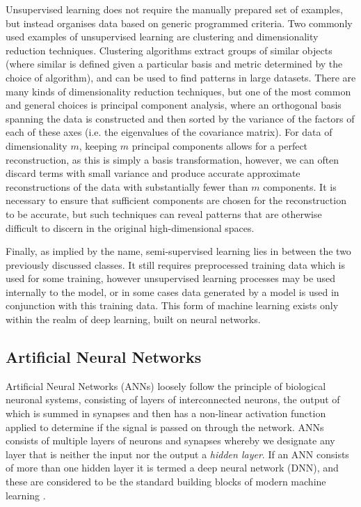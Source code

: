 Unsupervised learning does not require the manually prepared set of examples, but instead organises data based on generic programmed criteria.
Two commonly used examples of unsupervised learning are clustering and dimensionality reduction techniques.
Clustering algorithms extract groups of similar objects (where similar is defined given a particular basis and metric determined by the choice of algorithm), and can be used to find patterns in large datasets.
There are many kinds of dimensionality reduction techniques, but one of the most common and general choices is principal component analysis, where an orthogonal basis spanning the data is constructed and then sorted by the variance of the factors of each of these axes (i.e. the eigenvalues of the covariance matrix).
For data of dimensionality $m$, keeping $m$ principal components allows for a perfect reconstruction, as this is simply a basis transformation, however, we can often discard terms with small variance and produce accurate approximate reconstructions of the data with substantially fewer than $m$ components.
It is necessary to ensure that sufficient components are chosen for the reconstruction to be accurate, but such techniques can reveal patterns that are otherwise difficult to discern in the original high-dimensional spaces.

Finally, as implied by the name, semi-supervised learning lies in between the two previously discussed classes.
It still requires preprocessed training data which is used for some training, however unsupervised learning processes may be used internally to the model, or in some cases data generated by a model is used in conjunction with this training data.
This form of machine learning exists only within the realm of deep learning, built on neural networks.

\subsection{Artificial Neural Networks}

Artificial Neural Networks (ANNs) loosely follow the principle of biological neuronal systems, consisting of layers of interconnected neurons, the output of which is summed in synapses and then has a non-linear activation function applied to determine if the signal is passed on through the network.
ANNs consists of multiple layers of neurons and synapses whereby we designate any layer that is neither the input nor the output a \emph{hidden layer}.
If an ANN consists of more than one hidden layer it is termed a deep neural network (DNN), and these are considered to be the standard building blocks of modern machine learning \citep{Raschka2015}.

